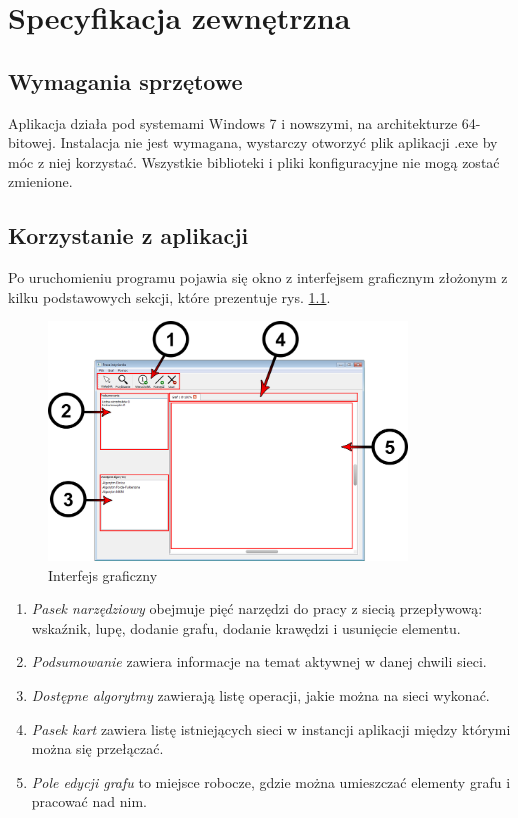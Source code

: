 \chapter{Specyfikacja zewnętrzna}
\section{Wymagania sprzętowe}
Aplikacja działa pod systemami Windows 7 i nowszymi, na architekturze 64-bitowej. Instalacja nie jest wymagana, wystarczy otworzyć plik aplikacji .exe by móc z niej korzystać. Wszystkie biblioteki i pliki konfiguracyjne nie mogą zostać zmienione.
\section{Korzystanie z aplikacji}
Po uruchomieniu programu pojawia się okno z interfejsem graficznym złożonym z kilku podstawowych sekcji, które prezentuje rys. \ref{fig:specZewInterfejs}.
\begin{figure}[H]
	\centering
	\includegraphics[width=0.85\textwidth]{./img/spec_zew01-1.png}
	\caption{Interfejs graficzny}
	\label{fig:specZewInterfejs}
\end{figure}
\begin{enumerate}
	\item \textit{Pasek narzędziowy} obejmuje pięć narzędzi do pracy z siecią przepływową: wskaźnik, lupę, dodanie grafu, dodanie krawędzi i usunięcie elementu.
	\item \textit{Podsumowanie} zawiera informacje na temat aktywnej w danej chwili sieci.
	\item \textit{Dostępne algorytmy} zawierają listę operacji, jakie można na sieci wykonać.
	\item \textit{Pasek kart} zawiera listę istniejących sieci w instancji aplikacji między którymi można się przełączać.
	\item \textit{Pole edycji grafu} to miejsce robocze, gdzie można umieszczać elementy grafu i pracować nad nim.
\end{enumerate}
